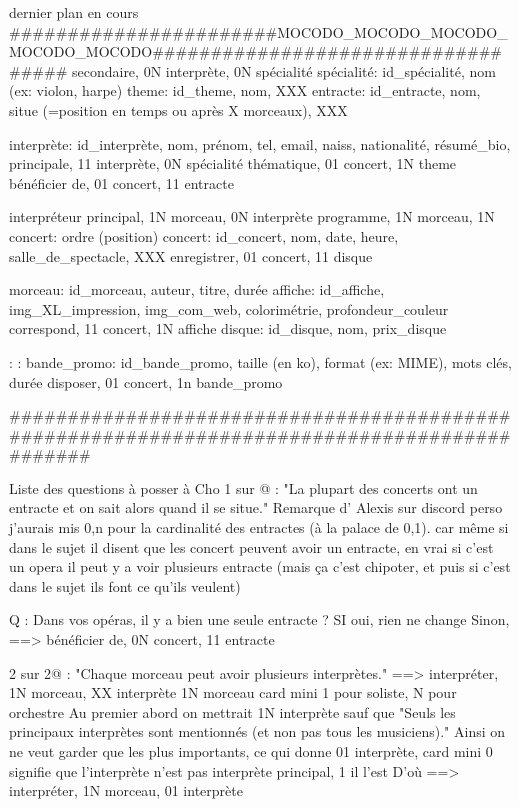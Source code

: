\documentclass[12pt,a4paper]{article}
\begin{document}
{dernier plan en cours
#######################MOCODO_MOCODO_MOCODO_MOCODO_MOCODO###################################
secondaire, 0N interprète, 0N spécialité
spécialité: id_spécialité, nom (ex: violon, harpe)
theme: id_theme, nom, XXX
entracte: id_entracte, nom, situe (=position en temps ou après X morceaux), XXX

interprète: id_interprète, nom, prénom, tel, email, naiss, nationalité, résumé_bio,
principale, 11 interprète, 0N spécialité
thématique, 01 concert, 1N theme
bénéficier de, 01 concert, 11 entracte

interpréteur principal, 1N morceau, 0N interprète
programme, 1N morceau, 1N concert: ordre (position)
concert: id_concert, nom, date, heure, salle_de_spectacle, XXX
enregistrer, 01 concert, 11 disque

morceau: id_morceau, auteur, titre, durée
affiche: id_affiche, img_XL_impression, img_com_web, colorimétrie, profondeur_couleur
correspond, 11 concert, 1N affiche
disque: id_disque, nom, prix_disque

:
:
bande_promo: id_bande_promo, taille (en ko), format (ex: MIME), mots clés, durée 
disposer, 01 concert, 1n bande_promo

#############################################################################################







Liste des questions à posser à Cho
1 sur @ : "La plupart des concerts ont un entracte et on sait alors quand il se situe."
Remarque d' Alexis sur discord
perso j'aurais mis 0,n pour la cardinalité des entractes (à la palace de 0,1). car même si dans le sujet il disent que les concert peuvent avoir un entracte, en vrai si c'est un opera il peut y a voir plusieurs entracte (mais ça c'est chipoter, et puis si c'est dans le sujet ils font ce qu'ils veulent)

Q : Dans vos opéras, il y a bien une seule entracte ?
SI oui, rien ne change
Sinon, ==>  bénéficier de, 0N concert, 11 entracte



2 sur 2@ : "Chaque morceau peut avoir plusieurs interprètes."
==> interpréter, 1N morceau, XX interprète
1N morceau card mini 1 pour soliste, N pour orchestre
Au premier abord on mettrait 1N interprète sauf que
"Seuls les principaux interprètes sont mentionnés (et non pas tous les musiciens)."
Ainsi on ne veut garder que les plus importants, ce qui donne
01 interprète, card mini 0 signifie que l'interprète n'est pas interprète principal, 1 il l'est
D'où ==> interpréter, 1N morceau, 01 interprète

}
\end{document}
